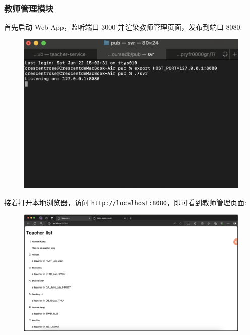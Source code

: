 \documentclass[12pt, oneside]{ctexart}
\numberwithin{figure}{section}
\numberwithin{table}{section}
\begin{document}
\subsubsection{教师管理模块}
首先启动 Web App，监听端口 3000 并渲染教师管理页面，发布到端口 8080:
\begin{figure}[!htbp]
    \centering
    \includegraphics[width=13cm]{images/sec5/svr.png}
\end{figure}
\newpage
接着打开本地浏览器，访问 \texttt{http://localhost:8080}，即可看到教师管理页面:
\begin{figure}[!htbp]
    \centering
    \includegraphics[width=13cm]{images/sec5/Teacher_Manage_Page.png}
\end{figure}
\end{document}
